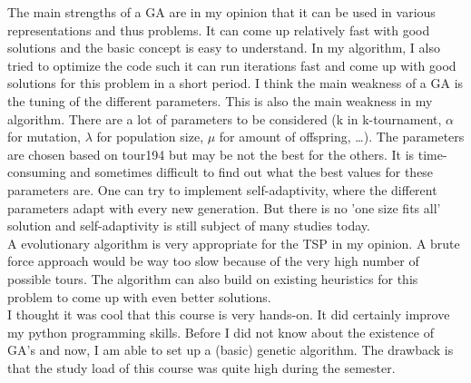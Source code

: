 \documentclass[a4paper,10pt]{article}
\newcommand{\ReplaceMe}[1]{{\color{blue}#1}}
\newcommand{\RemoveMe}[1]{{\color{purple}#1}}
\begin{document}

The main strengths of a GA are in my opinion that it can be used in various representations and thus problems. It can come up relatively fast with good solutions and the basic concept is easy to understand. In my algorithm, I also tried to optimize the code such it can run iterations fast and come up with good solutions for this problem in a short period.
I think the main weakness of a GA is the tuning of the different parameters. This is also the main weakness in my algorithm. There are a lot of parameters to be considered (k in k-tournament, $\alpha$ for mutation, $\lambda$ for population size, $\mu$ for amount of offspring, \ldots). The parameters are chosen based on tour194 but may be not the best for the others. It is time-consuming and sometimes difficult to find out what the best values for these parameters are. One can try to implement self-adaptivity, where the different parameters adapt with every new generation. But there is no 'one size fits all' solution and self-adaptivity is still subject of many studies today.  \\

A evolutionary algorithm is very appropriate for the TSP in my opinion. A brute force approach would be way too slow because of the very high number of possible tours. The algorithm can also build on existing heuristics for this problem to come up with even better solutions. \\

I thought it was cool that this course is very hands-on. It did certainly improve my python programming skills. Before I did not know about the existence of GA's and now, I am able to set up a (basic) genetic algorithm. The drawback is that the study load of this course was quite high during the semester.







\end{document}
